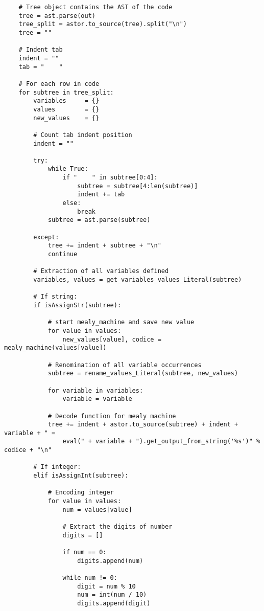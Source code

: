\documentclass[a4paper,oneside,openright,titlepage,10pt,footinclude,headinclude]{scrbook}
\begin{document}
\begin{graybox}[innerleftmargin=2,]
\begin{lstlisting}
    # Tree object contains the AST of the code
    tree = ast.parse(out)
    tree_split = astor.to_source(tree).split("\n")
    tree = ""

    # Indent tab
    indent = ""
    tab = "    "

    # For each row in code
    for subtree in tree_split:
        variables     = {}
        values        = {}
        new_values    = {}
        
        # Count tab indent position
        indent = ""

        try:
            while True:
                if "    " in subtree[0:4]:
                    subtree = subtree[4:len(subtree)]
                    indent += tab
                else:
                    break
            subtree = ast.parse(subtree)

        except:
            tree += indent + subtree + "\n"
            continue

        # Extraction of all variables defined
        variables, values = get_variables_values_Literal(subtree)

        # If string:
        if isAssignStr(subtree):

            # start mealy_machine and save new value
            for value in values:
                new_values[value], codice = mealy_machine(values[value])

            # Renomination of all variable occurrences
            subtree = rename_values_Literal(subtree, new_values)

            for variable in variables:
                variable = variable

            # Decode function for mealy machine
            tree += indent + astor.to_source(subtree) + indent + variable + " = 
                eval(" + variable + ").get_output_from_string('%s')" % codice + "\n"

        # If integer:
        elif isAssignInt(subtree):

            # Encoding integer
            for value in values:
                num = values[value]

                # Extract the digits of number
                digits = []

                if num == 0:
                    digits.append(num)

                while num != 0:
                    digit = num % 10
                    num = int(num / 10)
                    digits.append(digit)


\end{lstlisting}
\end{graybox}
\end{document}
